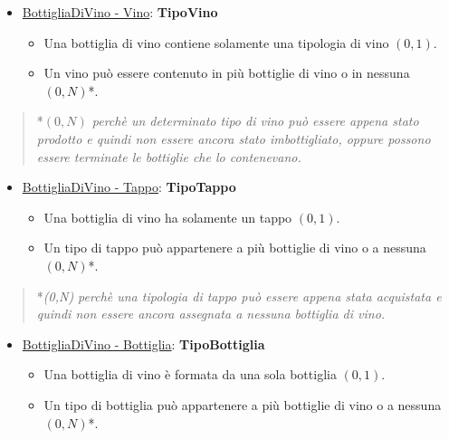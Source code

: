 \begin{itemize}
	\item \underline{BottigliaDiVino - Vino}: \textbf{TipoVino}
	
	\begin{itemize}
		\item Una bottiglia di vino contiene solamente una tipologia di vino $(0,1)$.
		\item Un vino può essere contenuto in più bottiglie di vino o in nessuna $(0,N)$*.
	\end{itemize}
	
\end{itemize}

\begin{verse}
	*\emph{$(0,N)$ perchè un determinato tipo di vino può essere appena stato prodotto e quindi non essere ancora stato imbottigliato, oppure possono essere terminate le bottiglie che lo contenevano.}
\end{verse}

\begin{itemize}
	\item \underline{BottigliaDiVino - Tappo}: \textbf{TipoTappo}
	
	\begin{itemize}
		\item Una bottiglia di vino ha solamente un tappo $(0,1)$.
		\item Un tipo di tappo può appartenere a più bottiglie di vino o a nessuna $(0,N)$*.
	\end{itemize}
	
\end{itemize}

\begin{verse}
	*\emph{(0,N) perchè una tipologia di tappo può essere appena stata acquistata e quindi non essere ancora assegnata a nessuna bottiglia di vino.}
\end{verse}

\begin{itemize}
	\item \underline{BottigliaDiVino - Bottiglia}: \textbf{TipoBottiglia}
	
	\begin{itemize}
		\item Una bottiglia di vino è formata da una sola bottiglia $(0,1)$.
		\item Un tipo di bottiglia può appartenere a più bottiglie di vino o a nessuna $(0,N)$*.
	\end{itemize}
	
\end{itemize}

